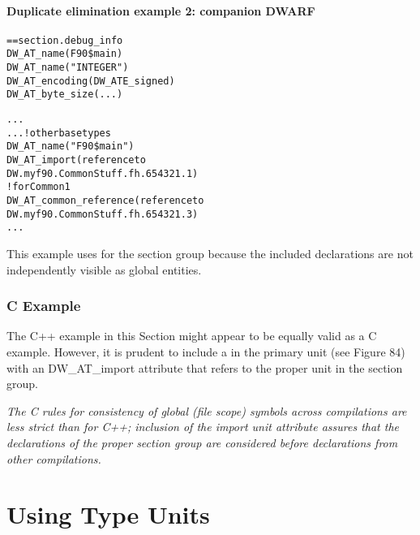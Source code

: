 \paragraph{Duplicate elimination example 2: companion DWARF }
\label{app:duplicateeliminationexample2companiondwarf}

\begin{alltt}
== section .debug\_info
        DW\_AT\_name(F90\$main)
            DW\_AT\_name("INTEGER")
            DW\_AT\_encoding(DW\_ATE\_signed)
            DW\_AT\_byte\_size(...)

            ...
        ...  ! other base types
            DW\_AT\_name("F90\$main")
                DW\_AT\_import(reference to
                    DW.myf90.CommonStuff.fh.654321.1)
             ! for Common1
                DW\_AT\_common\_reference(reference to
                    DW.myf90.CommonStuff.fh.654321.3)
            ...
\end{alltt}


This example uses  for the section group
because the included declarations are not independently
visible as global entities.


\subsubsection{C Example}

The C++ example in this Section might appear to be equally
valid as a C example. However, it is prudent to include
a  in the primary unit (see Figure 84)
with an DW\_AT\_import attribute that refers to the proper unit
in the section group.

\textit{The C rules for consistency of global (file scope) symbols
across compilations are less strict than for C++; inclusion
of the import unit attribute assures that the declarations of
the proper section group are considered before declarations
from other compilations.}


\section{Using Type Units}
\label{app:usingtypeunits}

